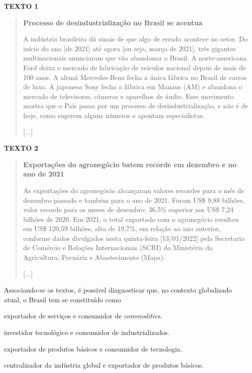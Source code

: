 \textbf{TEXTO 1}
\begin{quote}
\textbf{Processo de desindustrialização no Brasil se acentua}

A indústria brasileira dá sinais de que algo de errado acontece no
setor. Do início do ano [de 2021] até agora [ou seja, março de 2021], três gigantes multinacionais
anunciaram que vão abandonar o Brasil. A norte-americana Ford deixa o
mercado de fabricação de veículos nacional depois de mais de 100 anos. A
alemã Mercedes-Benz fecha a única fábrica no Brasil de carros de luxo. A
japonesa Sony fecha a fábrica em Manaus (AM) e abandona o mercado de
televisores, câmeras e aparelhos de áudio. Esse movimento mostra que o
País passa por um processo de desindustrialização, e não é de hoje, como
sugerem alguns números e apontam especialistas.

{[}...{]}

\end{quote}

\textbf{TEXTO 2}
\begin{quote}
\textbf{Exportações do agronegócio batem recorde em dezembro e no ano de 2021}

As exportações do agronegócio alcançaram valores recordes para o
mês de dezembro passado e também para o ano de 2021. Foram US\$ 9,88
bilhões, valor recorde para os meses de dezembro: 36,5\% superior aos
US\$ 7,24 bilhões de 2020. Em 2021, o total exportado com o agronegócio
resultou em US\$ 120,59 bilhões, alta de 19,7\%, em relação ao ano
anterior, conforme dados divulgados nesta quinta-feira [13/01/2022] pela
Secretaria de Comércio e Relações Internacionais (SCRI) do Ministério da
Agricultura, Pecuária e Abastecimento (Mapa).

{[}...{]}

\end{quote}

Associando-se os textos, é possível diagnosticar que, no contexto
globalizado atual, o Brasil tem se constituído como

\begin{escolha}
\item
  exportador de serviços e consumidor de \textit{commodities}.
\item
  investidor tecnológico e consumidor de industrializados.
\item
  exportador de produtos básicos e consumidor de tecnologia.
\item
  centralizador da indústria global e exportador de produtos básicos.
\end{escolha}

